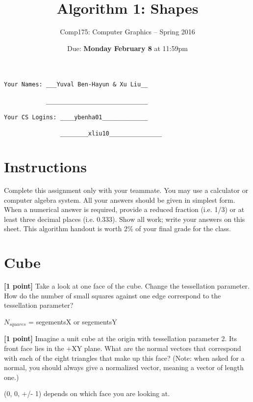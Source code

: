 \documentclass[10pt,twocolumn]{article}
\title{\Huge{\bf Algorithm 1: Shapes}}
\author{Comp175: Computer Graphics -- Spring 2016}
\date{Due:  {\bf Monday February 8} at 11:59pm}                                           %
\begin{document}
\maketitle

\begin{verbatim}
Your Names: ___Yuval Ben-Hayun & Xu Liu__

            _____________________________

Your CS Logins: ____ybenha01_____________

                ________xliu10_______________\end{verbatim}

\section{Instructions}
Complete this assignment only with your teammate. You may use a
calculator or computer algebra system. All your answers should be given in simplest form.
When a numerical answer is required, provide a reduced fraction (i.e. 1/3) or at least three
decimal places (i.e. 0.333). Show all work; write your answers on this sheet. This algorithm handout is worth 2\% of your final grade for the class.


\section{Cube}
 {\bf [1 point]} Take a look at one face of the cube. Change the tessellation parameter. How do the number of small squares against one edge correspond to the tessellation parameter?

\begin{framed}
 
  $N_{squares}$ = segementsX or segementsY
\vspace{6em}
\end{framed}
{\bf [1 point]} Imagine a unit cube at the origin with tessellation parameter 2. Its front face lies in the +XY plane. What are the normal vectors that correspond with each of the eight triangles that make up this face? (Note: when asked for a normal, you should always give a normalized vector, meaning a vector of length one.)
\begin{framed}
(0, 0, +/- 1) depends on which face you are looking at.
\vspace{6em}
\end{framed}
\end{document}
